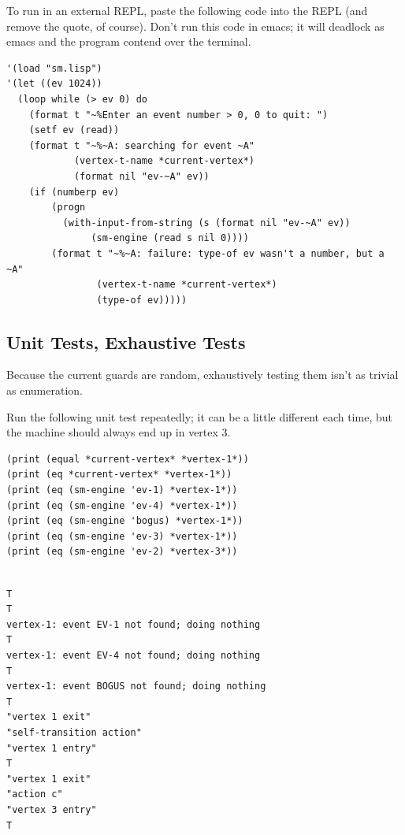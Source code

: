 \documentclass[10pt,oneside,x11names]{article}
\begin{document}
To run in an external REPL, paste the following code into the REPL (and
remove the quote, of course). Don't run this code in emacs; it will deadlock
as emacs and the program contend over the terminal.

\begin{verbatim}
'(load "sm.lisp")
'(let ((ev 1024))
  (loop while (> ev 0) do
    (format t "~%Enter an event number > 0, 0 to quit: ")
    (setf ev (read))
    (format t "~%~A: searching for event ~A"
            (vertex-t-name *current-vertex*)
            (format nil "ev-~A" ev))
    (if (numberp ev)
        (progn
          (with-input-from-string (s (format nil "ev-~A" ev))
               (sm-engine (read s nil 0))))
        (format t "~%~A: failure: type-of ev wasn't a number, but a ~A"
                (vertex-t-name *current-vertex*)
                (type-of ev)))))

\end{verbatim}

\subsection{Unit Tests, Exhaustive Tests}
\label{sec:org16cbad9}

Because the current guards are random, exhaustively testing them isn't as
trivial as enumeration.

Run the following unit test repeatedly; it can be a little different each
time, but the machine should always end up in vertex 3.

\begin{verbatim}
(print (equal *current-vertex* *vertex-1*))
(print (eq *current-vertex* *vertex-1*))
(print (eq (sm-engine 'ev-1) *vertex-1*))
(print (eq (sm-engine 'ev-4) *vertex-1*))
(print (eq (sm-engine 'bogus) *vertex-1*))
(print (eq (sm-engine 'ev-3) *vertex-1*))
(print (eq (sm-engine 'ev-2) *vertex-3*))
\end{verbatim}

\begin{verbatim}

T
T
vertex-1: event EV-1 not found; doing nothing
T
vertex-1: event EV-4 not found; doing nothing
T
vertex-1: event BOGUS not found; doing nothing
T
"vertex 1 exit"
"self-transition action"
"vertex 1 entry"
T
"vertex 1 exit"
"action c"
"vertex 3 entry"
T
\end{verbatim}
\end{document}

